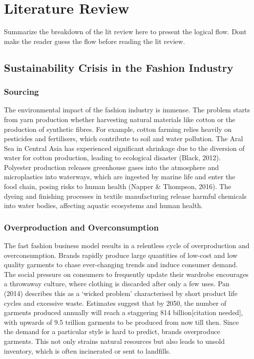 \chapter{Literature Review}
Summarize the breakdown of the lit review here to present the logical flow. Dont make the reader guess the flow before reading the lit review.

\section{Sustainability Crisis in the Fashion Industry} \label{sec:sections}

\subsection{Sourcing}
The environmental impact of the fashion industry is immense. The problem starts from yarn production whether harvesting natural materials like cotton or the production of synthetic fibres. For example, cotton farming relies heavily on pesticides and fertilisers, which contribute to soil and water pollution. The Aral Sea in Central Asia has experienced significant shrinkage due to the diversion of water for cotton production, leading to ecological disaster (Black, 2012). Polyester production releases greenhouse gases into the atmosphere and microplastics into waterways, which are ingested by marine life and enter the food chain, posing risks to human health (Napper \& Thompson, 2016). The dyeing and finishing processes in textile manufacturing release harmful chemicals into water bodies, affecting aquatic ecosystems and human health.

\subsection{Overproduction and Overconsumption}
The fast fashion business model results in a relentless cycle of overproduction and overconsumption. Brands rapidly produce large quantities of low-cost and low quality garments to chase ever-changing trends and induce consumer demand. The social pressure on consumers to frequently update their wardrobe encourages a throwaway culture, where clothing is discarded after only a few uses. Pan (2014) describes this as a ‘wicked problem’ characterised by short product life cycles and excessive waste. Estimates suggest that by 2050, the number of garments produced annually will reach a staggering 814 billion[citation needed], with upwards of 9.5 trillion garments to be produced from now till then. Since the demand for a particular style is hard to predict, brands overproduce garments. This not only strains natural resources but also leads to unsold inventory, which is often incinerated or sent to landfills.

